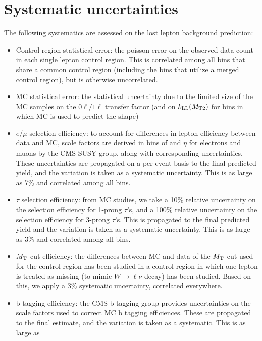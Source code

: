 
\section{Systematic uncertainties}
\label{sec:llep_syst}

The following systematics are assessed on the lost lepton background prediction:
\begin{itemize}\setlength\itemsep{0mm}
\item Control region statistical error: the poisson error on the observed data count in each single lepton control region.
This is correlated among all bins that share a common control region (including the \mttwo bins that utilize a merged control region),
but is otherwise uncorrelated.
\item MC statistical error: the statistical uncertainty due to the limited size of the MC samples on the $0\ell/1\ell$ transfer
factor (and on $k_{\mathrm{LL}}(M_{\mathrm{T2}})$ for bins in which MC is used to predict the \mttwo shape)
\item $e/\mu$ selection efficiency: to account for differences in lepton efficiency between data and MC, scale factors
are derived in bins of \pt and $\eta$ for electrons and muons by the CMS SUSY group, along with corresponding uncertainties.
These uncertainties are propagated on a per-event basis to the final predicted yield, and the variation is taken as a systematic
uncertainty. This is as large as 7\% and correlated among all bins.
\item $\tau$ selection efficiency: from MC studies, we take a 10\% relative uncertainty on the selection efficiency for 1-prong
$\tau$'s, and a 100\% relative uncertainty on the selection efficiency for 3-prong $\tau$'s. This is propagated to the final predicted
yield and the variation is taken as a systematic uncertainty. This is as large as 3\% and correlated among all bins.
\item $M_{\mathrm{T}}$ cut efficiency: the differences between MC and data of the $M_{\mathrm{T}}$ cut used for the control region
has been studied in a \zll control region in which one lepton is treated as missing (to mimic $W\to\ell\nu$ decay) has been
studied. Based on this, we apply a 3\% systematic uncertainty, correlated everywhere.
\item b tagging efficiency: the CMS b tagging group provides uncertainties on the scale factors used to correct MC b tagging
efficiences. These are propagated to the final estimate, and the variation is taken as a systematic. This is as large as

\end{itemize}
